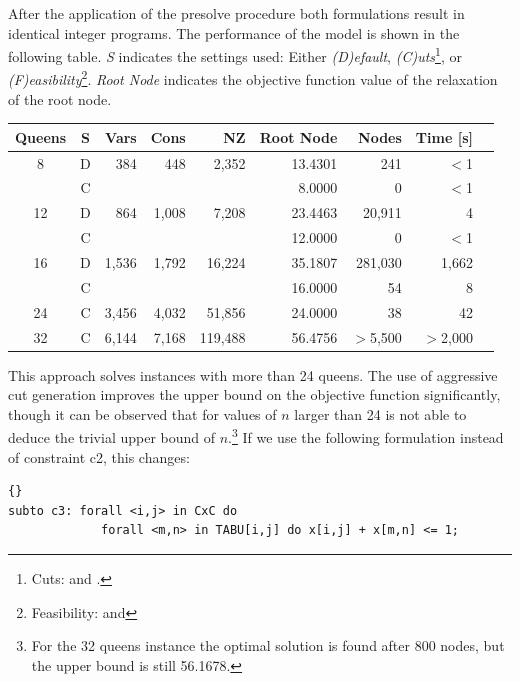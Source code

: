 \medskip
\noindent After the application of the \cplex presolve procedure both
formulations result in identical integer programs. The performance of
the model is shown in the following table. \emph{S} indicates the
\cplex settings used: Either \emph{(D)efault},
\emph{(C)uts}\footnote{Cuts:  and .}, or
\emph{(F)easibility}\footnote{Feasibility:  and }.
\emph{Root Node} indicates
the objective function value of the \lp relaxation of the root node.
\begin{center}
{\sffamily\small
\begin{tabular}{ccrrrrrrr}
\toprule
Queens & S & Vars & Cons &   NZ   & Root Node & Nodes & Time [s]\\
\midrule
   8   & D &   384 &   448 &   2,352 & 13.4301 &     241 & $<$1\\
       & C &       &       &         &  8.0000 &       0 & $<$1\\
  12   & D &   864 & 1,008 &   7,208 & 23.4463 &  20,911 & 4\\
       & C &       &       &         & 12.0000 &       0 & $<$1\\
  16   & D & 1,536 & 1,792 &  16,224 & 35.1807 & 281,030 & 1,662\\
       & C &       &       &         & 16.0000 &      54 & 8\\
  24   & C & 3,456 & 4,032 &  51,856 & 24.0000 &      38 & 42\\
  32   & C & 6,144 & 7,168 & 119,488 & 56.4756 & $>$5,500& $>$2,000\\
\bottomrule
\end{tabular}
}
\end{center}
This approach solves instances with more than 24 queens.
The use of aggressive cut generation improves the upper
bound on the objective function significantly, though
it can be observed that for values of
$n$ larger than 24 \cplex is not able to deduce the trivial upper
bound of $n$.\footnote{For the 32 queens instance the optimal solution is found
after 800 nodes, but the upper bound is still 56.1678.}
If we use the following formulation instead of constraint c2, this changes:

\medskip
\begin{lstlisting}[firstnumber=13]{}
subto c3: forall <i,j> in CxC do
             forall <m,n> in TABU[i,j] do x[i,j] + x[m,n] <= 1;
\end{lstlisting}

